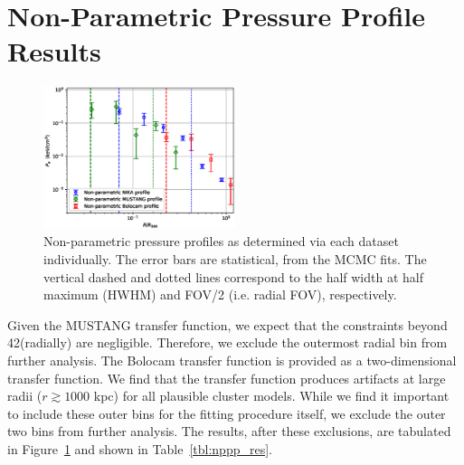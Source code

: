 \documentclass[twocolumn,traditabstract]{aa}
\begin{document}

\section{Non-Parametric Pressure Profile Results}
\label{sec:np_res}

\begin{figure}[!h]
  \centering
  \includegraphics[width=0.5\textwidth]{NIKA_ml_deproj_figs/Real_Joint_gNFW_Power_Real_11011111_2500S_500B_100W_non_parametric_pressure_p16cosmo.eps}
  \caption{Non-parametric pressure profiles as determined via each dataset individually. The error bars are statistical,
    from the MCMC fits. The vertical dashed and dotted lines correspond to the half width at half maximum (HWHM) and
    FOV/2 (i.e. radial FOV), respectively.}
  \label{fig:nppps}
\end{figure}

Given the MUSTANG transfer function, we expect that the constraints beyond 42\asecs (radially) are negligible. Therefore,
we exclude the outermost radial bin from further analysis.
The Bolocam transfer function is provided as a two-dimensional transfer function. We find that the transfer function produces
artifacts at large radii ($r \gtrsim 1000$ kpc) for all plausible cluster models. While we find it important to include these
outer bins for the fitting procedure itself, we exclude the outer two bins from further analysis. The results, after these
exclusions, are tabulated in Figure~\ref{fig:nppps} and shown in Table~\ref{tbl:nppp_res}.
\end{document}
